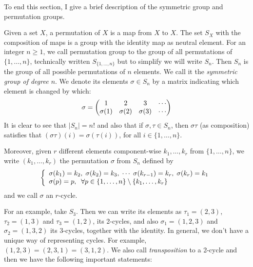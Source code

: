 \documentclass[../main.tex]{subfiles}
\begin{document}
To end this section, I give a brief description of the symmetric group and permutation groups.

Given a set $X$, a permutation of $X$ is a map from $X$ to $X$. The set $S_X$ with the composition of maps is a group with the identity map as neutral element. For an integer $n\geq 1$, we call permutation group to the group of all permutations of $\{1,\ldots,n\}$, technically written $S_{\{1,\ldots,n\}}$ but to simplify we will write $S_n$. Then $S_n$ is the group of all possible permutations of $n$ elements. We call it the \textit{symmetric group of degree $n$}. We denote its elements $\sigma\in S_n$ by a matrix indicating which element is changed by which:
\begin{equation}
    \notag
    \sigma = 
    \begin{pmatrix}
    1 & 2 & 3 & \cdots \\
    \sigma(1) & \sigma(2) & \sigma(3) & \cdots
    \end{pmatrix}
\end{equation}
It is clear to see that $|S_n| = n!$ and also that if $\sigma,\tau\in S_n$, then $\sigma\tau$ (as composition) satisfies that $(\sigma\tau)(i) = \sigma(\tau(i))$, for all $i\in\{1,\ldots,n\}$.

Moreover, given $r$ different elements component-wise $k_1,\ldots,k_r$ from $\{1,\ldots,n\}$, we write $(k_1,\ldots,k_r)$ the permutation $\sigma$ from $S_n$ defined by
\begin{equation}
    \notag
    \left\{
    \begin{array}{ll}
        \sigma(k_1) = k_2,\;\sigma(k_2) = k_3,\;\cdots\;\sigma(k_{r-1}) = k_r,\;\sigma(k_r) = k_1\\
        \sigma(p) = p,\;\;\forall p\in\{1,\ldots,n\}\setminus\{k_1,\ldots,k_r\}
    \end{array}
    \right.
\end{equation}
and we call $\sigma$ an $r$-cycle.

For an example, take $S_3$. Then we can write its elements as $\tau_1 = (2,3)$, $\tau_2=(1,3)$ and $\tau_3 = (1,2)$, its 2-cycles, and also $\sigma_1 = (1,2,3)$ and $\sigma_2 = (1,3,2)$ its 3-cycles, together with the identity. In general, we don't have a unique way of representing cycles. For example, $(1,2,3) = (2,3,1) = (3,1,2)$. We also call \textit{transposition} to a 2-cycle and then we have the following important statements:
\end{document}
